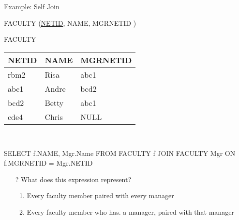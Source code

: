 \documentclass[aspectratio=169]{beamer}
\begin{document}
\begin{frame}[fragile]{Example: Self Join}

FACULTY (\underline{NETID}, NAME, MGRNETID )

FACULTY\\
\begin{tabular}{|l|l|l|} \hline
\textbf{NETID} & \textbf{NAME} & \textbf{MGRNETID} \\ \hline
rbm2 & Risa & abc1 \\\hline
abc1 & Andre & bcd2 \\\hline
bcd2 & Betty & abc1  \\ \hline
cde4 & Chris & NULL\\ \hline
\end{tabular}\\



\begin{SQL}
SELECT f.NAME, Mgr.Name
FROM FACULTY f JOIN FACULTY Mgr ON f.MGRNETID = Mgr.NETID
\end{SQL}

\begin{itemize}
\item[?] What does this expression represent?
\begin{enumerate}[A]
\item Every faculty member paired with every manager
\item Every faculty member who has. a manager, paired with that manager %
\end{enumerate}
\end{itemize}

\end{frame}
\end{document}
